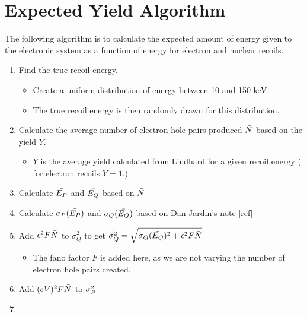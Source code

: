 \documentclass[12pt]{book}
\begin{document}
\section{Expected Yield Algorithm }
The following algorithm is to calculate the expected amount of energy given to the electronic system as a function of energy for electron and nuclear recoils. 

\begin{enumerate}
    \item Find the true recoil energy. 
    \begin{itemize}
        \item Create a uniform distribution of energy between 10 and 150 keV.
        \item The true recoil energy is then randomly drawn for this distribution. 
    \end{itemize} 
    
    \item Calculate the average number of electron hole pairs produced $\Bar{N}$ based on the yield $Y$.
        \begin{itemize}
            \item $Y$ is the average yield calculated from Lindhard for a given recoil energy ( for electron recoils $Y=1$.)
        \end{itemize}
    
    \item Calculate $\Bar{E_P}$ and $\Bar{E_Q}$ based on $\Bar{N}$
    
    \item Calculate $\sigma_P(\Bar{E_P})$ and $\sigma_Q(\Bar{E_Q})$ based on Dan Jardin's note [ref]
    \newpage
    \item Add $\epsilon^2 F\Bar{N}$ to $\sigma_Q^2$ to get $\Tilde{\sigma_Q^2} = \sqrt{\sigma_Q(\Bar{E_Q})^2 + \epsilon^2 F\Bar{N}}$
        \begin{itemize}
            \item The fano factor $F$ is added here, as we are not varying the number of electron hole pairs created.
        \end{itemize}
        
    \item Add $(eV)^2 F\Bar{N}$ to $\Tilde{\sigma_P^2}$
    
    \item 
    

\end{enumerate}
\end{document}
